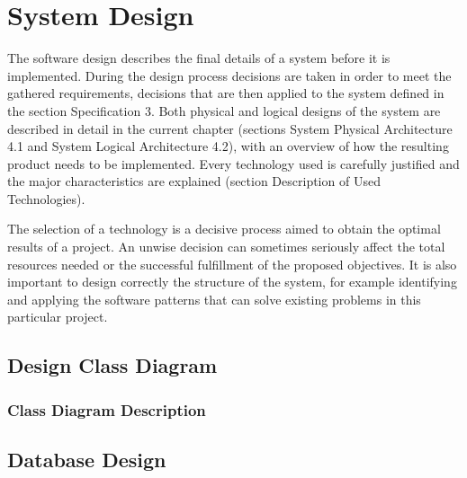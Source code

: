 \chapter{System Design}

The software design describes the final details of a system before it is implemented. During the design process decisions are taken in order to meet the gathered requirements, decisions that are then applied to the system defined in the section Specification 3. Both physical and logical designs of the system are described in detail in the current chapter (sections System Physical Architecture 4.1 and System Logical Architecture 4.2), with an overview of how the resulting product needs to be implemented. Every technology used is carefully justified and the major characteristics are explained (section Description of Used Technologies).

The selection of a technology is a decisive process aimed to obtain the optimal results of a project. An unwise decision can sometimes seriously affect the total resources needed or the successful fulfillment of the proposed objectives. It is also important to design correctly the structure of the system, for example identifying and applying the software patterns that can solve existing problems in this particular project.

\section{Design Class Diagram}

\subsection{Class Diagram Description}


\section{Database Design}

